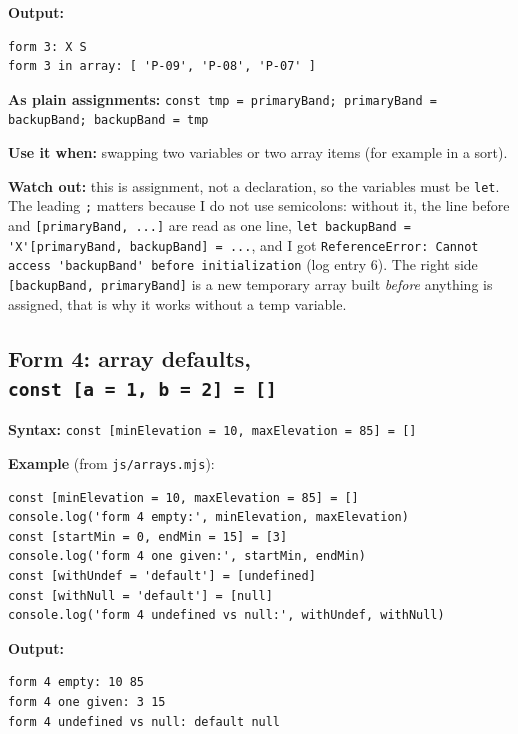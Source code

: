\textbf{Output:}

\begin{lstlisting}
form 3: X S
form 3 in array: [ 'P-09', 'P-08', 'P-07' ]
\end{lstlisting}

\textbf{As plain assignments:} \passthrough{\lstinline!const tmp = primaryBand; primaryBand = backupBand; backupBand = tmp!}

\textbf{Use it when:} swapping two variables or two array items (for example in a sort).

\textbf{Watch out:} this is assignment, not a declaration, so the variables must be \passthrough{\lstinline!let!}. The leading \passthrough{\lstinline!;!} matters because I do not use semicolons: without it, the line before and \passthrough{\lstinline![primaryBand, ...]!} are read as one line, \passthrough{\lstinline!let backupBand = 'X'[primaryBand, backupBand] = ...!}, and I got \passthrough{\lstinline!ReferenceError: Cannot access 'backupBand' before initialization!} (log entry 6). The right side \passthrough{\lstinline![backupBand, primaryBand]!} is a new temporary array built \emph{before} anything is assigned, that is why it works without a temp variable.

\hypertarget{form-4-array-defaults-const-a--1-b--2--}{%
\subsection{\texorpdfstring{Form 4: array defaults, \texttt{const\ {[}a\ =\ 1,\ b\ =\ 2{]}\ =\ {[}{]}}}{Form 4: array defaults, const {[}a = 1, b = 2{]} = {[}{]}}}\label{form-4-array-defaults-const-a--1-b--2--}}

\textbf{Syntax:} \passthrough{\lstinline!const [minElevation = 10, maxElevation = 85] = []!}

\textbf{Example} (from \passthrough{\lstinline!js/arrays.mjs!}):

\begin{lstlisting}
const [minElevation = 10, maxElevation = 85] = []
console.log('form 4 empty:', minElevation, maxElevation)
const [startMin = 0, endMin = 15] = [3]
console.log('form 4 one given:', startMin, endMin)
const [withUndef = 'default'] = [undefined]
const [withNull = 'default'] = [null]
console.log('form 4 undefined vs null:', withUndef, withNull)
\end{lstlisting}

\textbf{Output:}

\begin{lstlisting}
form 4 empty: 10 85
form 4 one given: 3 15
form 4 undefined vs null: default null
\end{lstlisting}

